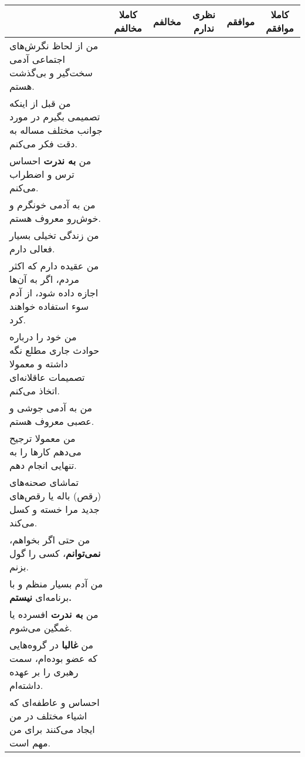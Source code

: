 \documentclass[a4paper,10pt]{article}
\begin{document}
\begin{center}
\begin{tabular}{|p{6cm}|c|c|c|c|c|}
\hline
 & کاملا مخالفم & مخالفم & نظری ندارم & موافقم & کاملا موافقم\\
\hline

من از لحاظ نگرش‌های اجتماعی آدمی سخت‌گیر و بی‌گذشت هستم.& & & & & \\
\hline

من قبل از اینکه تصمیمی بگیرم در مورد جوانب مختلف مساله به دقت فکر می‌کنم.& & & & & \\
\hline

من \textbf{به ندرت} احساس ترس و اضطراب می‌کنم.& & & & & \\
\hline

من به آدمی خونگرم و خوش‌رو معروف هستم.& & & & & \\
\hline

من زندگی تخیلی بسیار فعالی دارم.& & & & & \\
\hline

من عقیده دارم که اکثر مردم، اگر به آن‌ها اجازه داده شود، از آدم سوء استفاده خواهند کرد.& & & & & \\
\hline

من خود را درباره حوادث جاری مطلع نگه داشته و معمولا تصمیمات عاقلانه‌ای اتخاذ می‌کنم.& & & & & \\
\hline

من به آدمی جوشی و عصبی معروف هستم.& & & & & \\
\hline

من معمولا ترجیح می‌دهم کارها را به تنهایی انجام دهم.& & & & & \\
\hline

تماشای صحنه‌های (رقص) باله یا رقص‌های جدید مرا خسته و کسل می‌کند.& & & & & \\
\hline

من حتی اگر بخواهم، \textbf{نمی‌توانم}، کسی را گول بزنم.& & & & & \\
\hline

من آدم بسیار منظم و با برنامه‌ای \textbf{نیستم.}& & & & & \\
\hline

من \textbf{به ندرت} افسرده یا غمگین می‌شوم.& & & & & \\
\hline

من \textbf{غالبا} در گروه‌هایی که عضو بوده‌ام، سمت رهبری را بر عهده داشته‌ام.& & & & & \\
\hline

احساس و عاطفه‌ای که اشیاء مختلف در من ایجاد می‌کنند برای من مهم است.& & & & & \\
\hline


\end{tabular}
\end{center}
\end{document}
